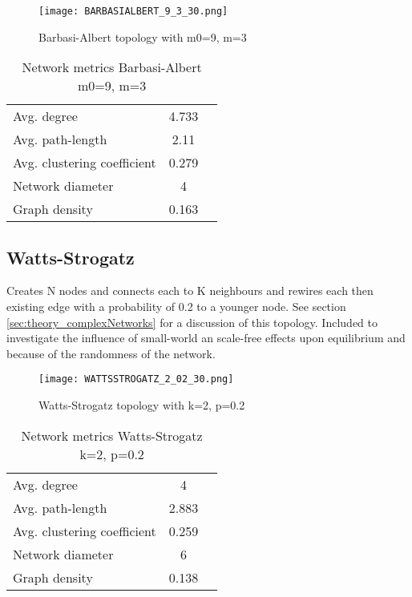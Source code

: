 \documentclass[Bachelorarbeit.tex]{subfiles}
\begin{document}
\begin{figure}[H]
	\centering
  \texttt{[image: BARBASIALBERT\_9\_3\_30.png]}
	\caption{Barbasi-Albert topology with m0=9, m=3}
	\label{fig:topology_BARBASIALBERT_9_3_30}
\end{figure}

\begin{table}[h]
	\centering
	\caption{Network metrics Barbasi-Albert m0=9, m=3}
	\begin{tabular} { l c r }
		\hline
		Avg. degree & 4.733 \\
		Avg. path-length & 2.11 \\
		Avg. clustering coefficient & 0.279 \\
		Network diameter & 4 \\
		Graph density & 0.163 \\
		\hline
	\end{tabular}
\end{table}

\subsection{Watts-Strogatz}
Creates N nodes and connects each to K neighbours and rewires each then existing edge with a probability of 0.2 to a younger node. See section \ref{sec:theory_complexNetworks} for a discussion of this topology.
\medskip
Included to investigate the influence of small-world an scale-free effects upon equilibrium and because of the randomness of the network.

\begin{figure}[H]
	\centering
  \texttt{[image: WATTSSTROGATZ\_2\_02\_30.png]}
	\caption{Watts-Strogatz topology with k=2, p=0.2}
	\label{fig:topology_WATTSSTROGATZ_2_02_30}
\end{figure}

\begin{table}[h]
	\centering
	\caption{Network metrics Watts-Strogatz k=2, p=0.2}
	\begin{tabular} { l c r }
		\hline
		Avg. degree & 4 \\
		Avg. path-length & 2.883 \\
		Avg. clustering coefficient & 0.259 \\
		Network diameter & 6 \\
		Graph density & 0.138 \\
		\hline
	\end{tabular}
\end{table}
\end{document}
